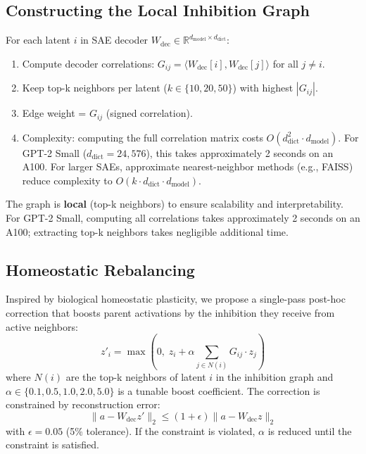 \documentclass{article}
\begin{document}
\subsection{Constructing the Local Inhibition Graph}
\label{sec:graph}

For each latent $i$ in SAE decoder $W_{\text{dec}} \in \mathbb{R}^{d_{\text{model}} \times d_{\text{dict}}}$:
\begin{enumerate}
    \item Compute decoder correlations: $G_{ij} = \langle W_{\text{dec}}[i], W_{\text{dec}}[j] \rangle$ for all $j \neq i$.
    \item Keep top-k neighbors per latent ($k \in \{10, 20, 50\}$) with highest $|G_{ij}|$.
    \item Edge weight = $G_{ij}$ (signed correlation).
    \item Complexity: computing the full correlation matrix costs $O(d_{\text{dict}}^2 \cdot d_{\text{model}})$. For GPT-2 Small ($d_{\text{dict}} = 24{,}576$), this takes approximately 2 seconds on an A100. For larger SAEs, approximate nearest-neighbor methods (e.g., FAISS) reduce complexity to $O(k \cdot d_{\text{dict}} \cdot d_{\text{model}})$.
\end{enumerate}

The graph is \textbf{local} (top-k neighbors) to ensure scalability and interpretability. For GPT-2 Small, computing all correlations takes approximately 2 seconds on an A100; extracting top-k neighbors takes negligible additional time.

\subsection{Homeostatic Rebalancing}
\label{sec:rebalancing}

Inspired by biological homeostatic plasticity, we propose a single-pass post-hoc correction that boosts parent activations by the inhibition they receive from active neighbors:
\begin{equation}
z'_i = \max\left(0, \; z_i + \alpha \sum_{j \in N(i)} G_{ij} \cdot z_j\right)
\end{equation}
where $N(i)$ are the top-k neighbors of latent $i$ in the inhibition graph and $\alpha \in \{0.1, 0.5, 1.0, 2.0, 5.0\}$ is a tunable boost coefficient. The correction is constrained by reconstruction error:
\begin{equation}
\|a - W_{\text{dec}} z'\|_2 \leq (1 + \epsilon) \|a - W_{\text{dec}} z\|_2
\end{equation}
with $\epsilon = 0.05$ (5\% tolerance). If the constraint is violated, $\alpha$ is reduced until the constraint is satisfied.
\end{document}
